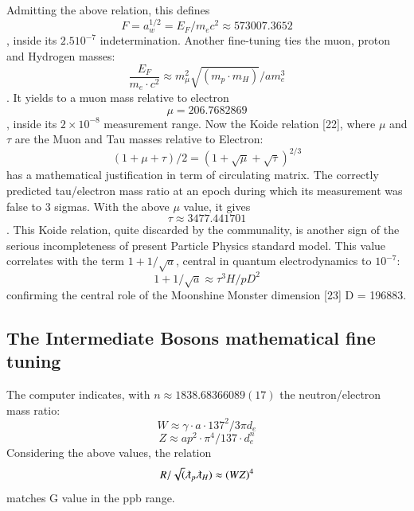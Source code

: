 \documentclass[twoside,draft]{article}
\begin{document}
{Admitting the above relation, this defines \begin{equation} 
F = a_{w}^{1/2} = E_{F} /m_{e} c^{2} \approx 573007.3652
\end{equation}, inside its $2.5 10^{-7}$
indetermination. Another fine-tuning ties the muon, proton and Hydrogen masses: 
\begin{equation}
\frac{E_{F}}{m_{e} \cdot c^{2}} \approx
m_{\mu}^{2} \sqrt{(m_{p} \cdot m_{H})}/am_{e}^{3}
\end{equation}. 
It yields to a muon mass relative to electron 
\begin{equation}
\mu = 206.7682869
\end{equation}, inside its
$2 \times 10^{-8}$ measurement range.
Now the Koide relation [22], where $\mu$ and $\tau$ are the Muon and Tau masses relative to Electron:
\begin{equation}
(1 + \mu + \tau)/2 = (1 + \sqrt\mu + \sqrt\tau)^{2/3}
\end{equation}
has a mathematical justification in term of circulating matrix. The correctly predicted tau/electron
mass ratio at an epoch during which its measurement was false to 3 sigmas. With the above $\mu$ value, it
gives $$\tau \approx 3477.441701$$. This Koide relation, quite discarded by the communality, is another sign of
the serious incompleteness of present Particle Physics standard model. This value correlates with the
term $1+1/\sqrt{a}$, central in quantum electrodynamics to $10^{-7}$:
\begin{equation}
1+1/\sqrt{a} \approx \tau^{3} H/pD^{2}
\end{equation}
confirming the central role of the Moonshine Monster dimension [23] D = 196883.

\subsection {The Intermediate Bosons mathematical fine tuning}

The computer indicates, with $n \approx 1838.68366089(17)$ the neutron/electron mass ratio:
\begin{equation}
W \approx \gamma \cdot a \cdot 137^{2} / 3\pi d_{e}
\end{equation}
\begin{equation}
Z \approx ap^{2} \cdot \pi^{4} / 137 \cdot d_{e}^{n}
\end{equation}
Considering the above values, the relation $$R/\sqrt(\lambdabar_{p} \lambdabar_{H} ) \approx (WZ)^{4}$$ matches G value in the ppb range.

}
\end{document}
